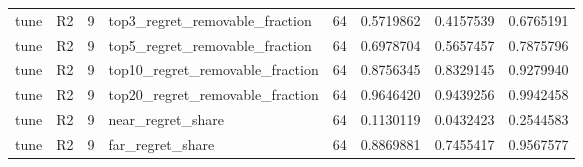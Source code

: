 \begin{tabular}{llrlrrrr}
tune & R2 & 9 & top3_regret_removable_fraction & 64 & 0.5719862 & 0.4157539 & 0.6765191 \\
tune & R2 & 9 & top5_regret_removable_fraction & 64 & 0.6978704 & 0.5657457 & 0.7875796 \\
tune & R2 & 9 & top10_regret_removable_fraction & 64 & 0.8756345 & 0.8329145 & 0.9279940 \\
tune & R2 & 9 & top20_regret_removable_fraction & 64 & 0.9646420 & 0.9439256 & 0.9942458 \\
tune & R2 & 9 & near_regret_share & 64 & 0.1130119 & 0.0432423 & 0.2544583 \\
tune & R2 & 9 & far_regret_share & 64 & 0.8869881 & 0.7455417 & 0.9567577 \\
\bottomrule
\end{tabular}
